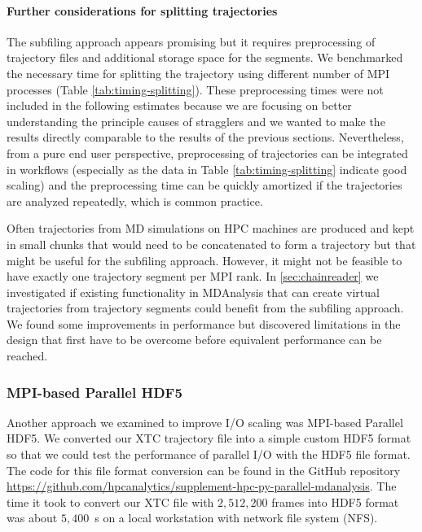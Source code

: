 \paragraph{Further considerations for splitting trajectories}
The subfiling approach appears promising but it requires preprocessing of trajectory files and additional storage space for the segments.
We benchmarked the necessary time for splitting the trajectory using different number of MPI processes (Table \ref{tab:timing-splitting}).
These preprocessing times were not included in the following estimates because we are focusing on better understanding the principle causes of stragglers and we wanted to make the results directly comparable to the results of the previous sections.
Nevertheless, from a pure end user perspective, preprocessing of trajectories can be integrated in workflows (especially as the data in Table \ref{tab:timing-splitting} indicate good scaling) and the preprocessing time can be quickly amortized if the trajectories are analyzed repeatedly, which is common practice.

Often trajectories from MD simulations on HPC machines are produced and kept in small chunks that would need to be concatenated to form a trajectory but that might be useful for the subfiling approach.
However, it might not be feasible to have exactly one trajectory segment per MPI rank.
In \ref{sec:chainreader} we investigated if existing functionality in MDAnalysis that can create virtual trajectories from trajectory segments could benefit from the subfiling approach.
We found some improvements in performance but discovered limitations in the design that first have to be overcome before equivalent performance can be reached.


 
\subsubsection{MPI-based Parallel HDF5}
\label{HDF5}
Another approach we examined to improve I/O scaling was MPI-based Parallel HDF5. 
We converted our XTC trajectory file into a simple custom HDF5 format so that we could test the performance of parallel I/O with the HDF5 file format.
The code for this file format conversion can be found in the GitHub repository \url{https://github.com/hpcanalytics/supplement-hpc-py-parallel-mdanalysis}.
The time it took to convert our XTC file with $2,512,200$ frames into HDF5 format was about $5,400$~s on a local workstation with network file system (NFS).

